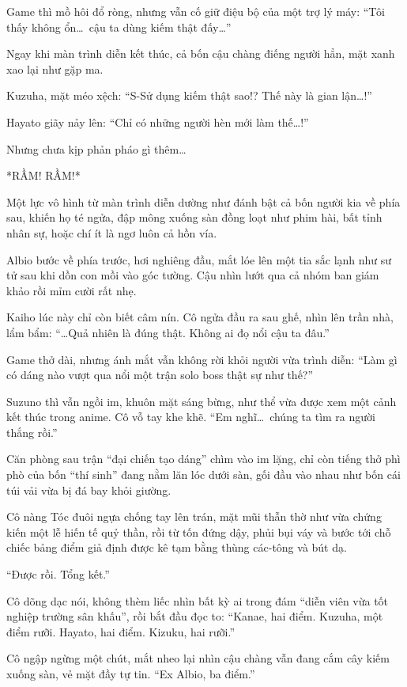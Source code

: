 \documentclass[../main.tex]{subfiles}
\begin{document}
Game thì mồ hôi đổ ròng, nhưng vẫn cố giữ điệu bộ của một trợ lý máy: ``Tôi thấy không ổn\dots\ cậu ta dùng kiếm thật đấy\dots''

Ngay khi màn trình diễn kết thúc, cả bốn cậu chàng điếng người hẳn, mặt xanh xao lại như gặp ma.

Kuzuha, mặt méo xệch: ``S-Sử dụng kiếm thật sao!? Thế này là gian lận\dots!''

Hayato giãy nảy lên: ``Chỉ có những người hèn mới làm thế\dots!''

Nhưng chưa kịp phản pháo gì thêm\dots

*RẦM! RẦM!*

Một lực vô hình từ màn trình diễn dường như đánh bật cả bốn người kia về phía sau, khiến họ té ngửa, đập mông xuống sàn đồng loạt như phim hài, bất tỉnh nhân sự, hoặc chí ít là ngơ luôn cả hồn vía.

Albio bước về phía trước, hơi nghiêng đầu, mắt lóe lên một tia sắc lạnh như sư tử sau khi dồn con mồi vào góc tường. Cậu nhìn lướt qua cả nhóm ban giám khảo rồi mỉm cười rất nhẹ.

Kaiho lúc này chỉ còn biết câm nín. Cô ngửa đầu ra sau ghế, nhìn lên trần nhà, lẩm bẩm: ``\dots Quả nhiên là đúng thật. Không ai đọ nổi cậu ta đâu.''

Game thở dài, nhưng ánh mắt vẫn không rời khỏi người vừa trình diễn: ``Làm gì có dáng nào vượt qua nổi một trận solo boss thật sự như thế?''

Suzuno thì vẫn ngồi im, khuôn mặt sáng bừng, như thể vừa được xem một cảnh kết thúc trong anime. Cô vỗ tay khe khẽ. ``Em nghĩ\dots\ chúng ta tìm ra người thắng rồi.''

\ct

Căn phòng sau trận ``đại chiến tạo dáng'' chìm vào im lặng, chỉ còn tiếng thở phì phò của bốn ``thí sinh'' đang nằm lăn lóc dưới sàn, gối đầu vào nhau như bốn cái túi vải vừa bị đá bay khỏi giường.

Cô nàng Tóc đuôi ngựa chống tay lên trán, mặt mũi thẫn thờ như vừa chứng kiến một lễ hiến tế quỷ thần, rồi từ tốn đứng dậy, phủi bụi váy và bước tới chỗ chiếc bảng điểm giả định được kê tạm bằng thùng các-tông và bút dạ.

``Được rồi. Tổng kết.''

Cô dõng dạc nói, không thèm liếc nhìn bất kỳ ai trong đám ``diễn viên vừa tốt nghiệp trường sân khấu'', rồi bắt đầu đọc to: ``Kanae, hai điểm. Kuzuha, một điểm rưỡi. Hayato, hai điểm.
Kizuku, hai rưỡi.''

Cô ngập ngừng một chút, mắt nheo lại nhìn cậu chàng vẫn đang cắm cây kiếm xuống sàn, vẻ mặt đầy tự tin. ``Ex Albio, ba điểm.''
\end{document}
